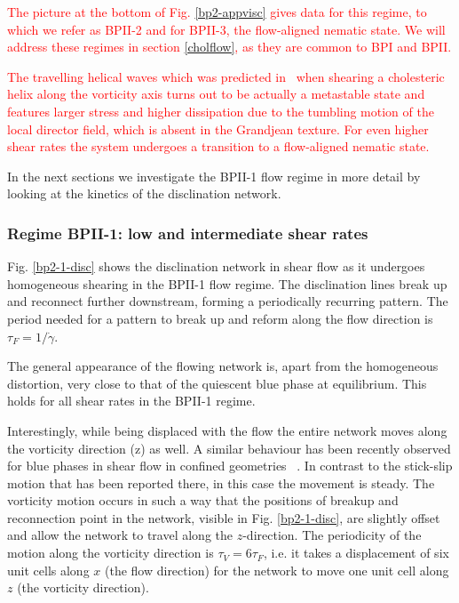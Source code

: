 \documentclass[8.5pt,twoside,twocolumn]{article}
\newcommand{\gd}{\dot{\gamma}}
\newcommand{\rev}[1]{{\textcolor{red}{#1}}}
\begin{document}
\rev{The picture at the bottom of Fig. \ref{bp2-appvisc} gives data for this regime, to which we refer as BPII-2 and for BPII-3,
the flow-aligned nematic state. We will address these regimes in section \ref{cholflow}, as they are common to BPI and BPII.}

\rev{The travelling helical waves which was predicted in~\cite{Rey:1996a,Rey:1996b} when shearing a cholesteric helix along
the vorticity axis turns out to be actually a metastable state and features larger stress and higher dissipation due 
to the tumbling motion of the local director field, which is absent in the Grandjean texture.
For even higher shear rates the system undergoes a transition to a flow-aligned nematic state.}

In the next sections we investigate the BPII-1 flow regime in more detail 
by looking at the kinetics of the disclination network.

\subsubsection{Regime BPII-1: low and intermediate shear rates }

Fig. \ref{bp2-1-disc} shows the disclination network in shear flow as
it undergoes homogeneous shearing in the BPII-1 flow regime. 
The disclination lines break up and 
reconnect further downstream, forming a periodically recurring pattern. The
period needed for a pattern to break up and 
reform along the flow direction is $\tau_F = 1/\gd$.

The general appearance of the flowing network is, apart from the homogeneous distortion,
very close to that of the quiescent blue phase at equilibrium. This holds for all
shear rates in the BPII-1 regime.

Interestingly, while being displaced with the flow the entire network moves 
along the vorticity direction (z) as well.  A similar behaviour has been recently 
observed for blue phases in shear flow in confined geometries ~\cite{Henrich:2012b}.
In contrast to the stick-slip motion that has been reported there,
in this case the movement is steady. 
The vorticity motion occurs in such a way that the positions of breakup and reconnection 
point in the network, visible in Fig. \ref{bp2-1-disc}, are slightly offset and allow the network 
to travel along the $z$-direction. The periodicity of the motion along the vorticity direction
is $\tau_V=6\tau_F$, 
i.e. it takes a displacement of six unit cells along $x$ (the flow direction) 
for the network to move one unit cell along $z$ (the vorticity direction).
\end{document}
